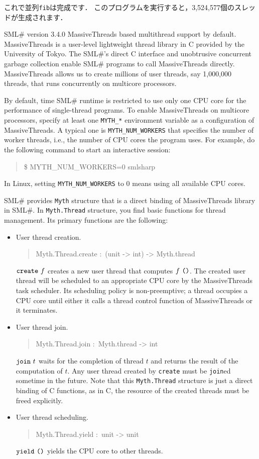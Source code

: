 \documentclass{jbook}
\newcommand{\smlsharp}{SML\#}
\newenvironment{program}{\begin{quote}\begin{tt}}%
                        {\end{tt}\end{quote}}
\begin{document}
	これで並列{\tt fib}は完成です．
	このプログラムを実行すると，3,524,577個のスレッドが生成されます．

\else%

	\smlsharp{} version 3.4.0 MassiveThreads based multithread
support by default.
	MassiveThreads is a user-level lightweight thread library in C
provided by the University of Tokyo.
	The \smlsharp{}'s direct C interface and unobtrusive
concurrent garbage collection enable \smlsharp{} programs to call
MassiveThreads directly.
	MassiveThreads allows us to create millions of user threads,
say 1,000,000 threads, that runs concurrently on multicore processors.

	By default, time \smlsharp{} runtime is restricted to use
only one CPU core for the performance of single-thread programs.
	To enable MassiveThreads on multicore processors,
specify at least one \verb|MYTH_*| environment variable as a configuration
of MassiveThreads.
	A typical one is \verb|MYTH_NUM_WORKERS| that specifies the
number of worker threads, i.e., the number of CPU cores the program
uses.
	For example, do the following command to start an interactive
session:
\begin{program}
\$ MYTH\_NUM\_WORKERS=0 smlsharp
\end{program}
	In Linux, setting \verb|MYTH_NUM_WORKERS| to 0 means
using all available CPU cores.

	\smlsharp{} provides {\tt Myth} structure that is a direct
binding of MassiveThreads library in \smlsharp{}.
	In {\tt Myth.Thread} structure,
you find basic functions for thread management.
	Its primary functions are the following:
\begin{itemize}
\item
	User thread creation.
\begin{program}
Myth.Thread.create :\ (unit -> int) -> Myth.thread
\end{program}
	$\mbox{\tt create}\ f$
creates a new user thread that computes
$f\ \mbox{\tt ()}$.
	The created user thread will be scheduled to an appropriate
CPU core by the MassiveThreads task scheduler.
	Its scheduling policy is non-preemptive;
a thread occupies a CPU core until
either it calls a thread control function of MassiveThreads
or it terminates.
\item
	User thread join.
\begin{program}
Myth.Thread.join :\ Myth.thread -> int
\end{program}
	$\mbox{\tt join}\ t$
waits for the completion of thread $t$ and returns the result of the
computation of $t$.
	Any user thread created by {\tt create} must be
{\tt join}ed sometime in the future.
	Note that this {\tt Myth.Thread} structure is just a direct
binding of C functions, as in C, the resource of the created threads
must be freed explicitly.
\item
	User thread scheduling.
\begin{program}
Myth.Thread.yield :\ unit -> unit
\end{program}
	$\mbox{\tt yield}\ \mbox{\tt ()}$
yields the CPU core to other threads.
\end{itemize}
\end{document}
